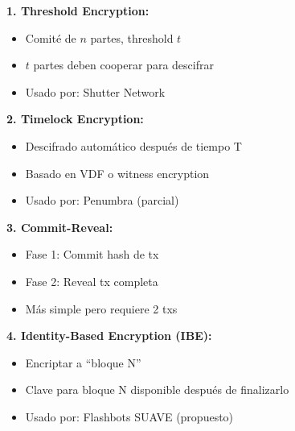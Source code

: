 \documentclass[11pt,a4paper,twoside]{book}
\theoremstyle{definition}
\theoremstyle{remark}
\begin{document}
\begin{mathnote}
\textbf{1. Threshold Encryption:}
\begin{itemize}
    \item Comité de $n$ partes, threshold $t$
    \item $t$ partes deben cooperar para descifrar
    \item Usado por: Shutter Network
\end{itemize}

\textbf{2. Timelock Encryption:}
\begin{itemize}
    \item Descifrado automático después de tiempo T
    \item Basado en VDF o witness encryption
    \item Usado por: Penumbra (parcial)
\end{itemize}

\textbf{3. Commit-Reveal:}
\begin{itemize}
    \item Fase 1: Commit hash de tx
    \item Fase 2: Reveal tx completa
    \item Más simple pero requiere 2 txs
\end{itemize}

\textbf{4. Identity-Based Encryption (IBE):}
\begin{itemize}
    \item Encriptar a ``bloque N''
    \item Clave para bloque N disponible después de finalizarlo
    \item Usado por: Flashbots SUAVE (propuesto)
\end{itemize}
\end{mathnote}
\end{document}
